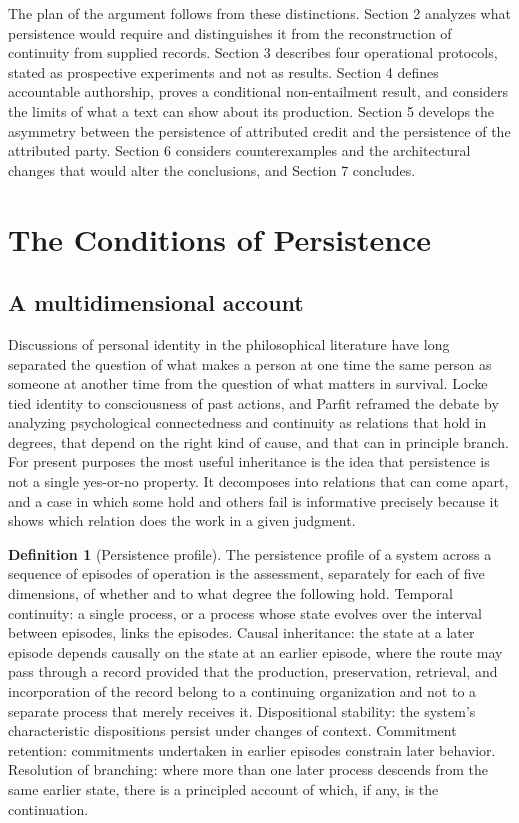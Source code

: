 \documentclass[12pt]{article}
\theoremstyle{definition}
\newtheorem{definition}{Definition}
\theoremstyle{plain}
\begin{document}
The plan of the argument follows from these distinctions. Section 2 analyzes what persistence would require and distinguishes it from the reconstruction of continuity from supplied records. Section 3 describes four operational protocols, stated as prospective experiments and not as results. Section 4 defines accountable authorship, proves a conditional non-entailment result, and considers the limits of what a text can show about its production. Section 5 develops the asymmetry between the persistence of attributed credit and the persistence of the attributed party. Section 6 considers counterexamples and the architectural changes that would alter the conclusions, and Section 7 concludes.

\section{The Conditions of Persistence}

\subsection{A multidimensional account}

Discussions of personal identity in the philosophical literature have long separated the question of what makes a person at one time the same person as someone at another time from the question of what matters in survival. Locke tied identity to consciousness of past actions, and Parfit \cite{parfit1984} reframed the debate by analyzing psychological connectedness and continuity as relations that hold in degrees, that depend on the right kind of cause, and that can in principle branch. For present purposes the most useful inheritance is the idea that persistence is not a single yes-or-no property. It decomposes into relations that can come apart, and a case in which some hold and others fail is informative precisely because it shows which relation does the work in a given judgment.

\begin{definition}[Persistence profile]\label{def:profile}
The persistence profile of a system across a sequence of episodes of operation is the assessment, separately for each of five dimensions, of whether and to what degree the following hold. Temporal continuity: a single process, or a process whose state evolves over the interval between episodes, links the episodes. Causal inheritance: the state at a later episode depends causally on the state at an earlier episode, where the route may pass through a record provided that the production, preservation, retrieval, and incorporation of the record belong to a continuing organization and not to a separate process that merely receives it. Dispositional stability: the system's characteristic dispositions persist under changes of context. Commitment retention: commitments undertaken in earlier episodes constrain later behavior. Resolution of branching: where more than one later process descends from the same earlier state, there is a principled account of which, if any, is the continuation.
\end{definition}
\end{document}
